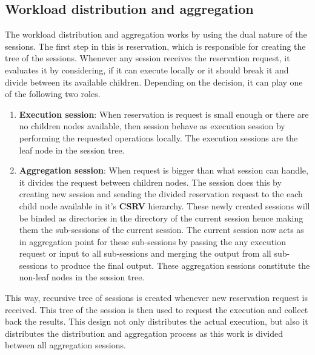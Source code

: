 \subsection{Workload distribution and aggregation}
The workload distribution and aggregation works by using the dual nature of
the sessions.  The first step in this is reservation, which is responsible for
creating the tree of the sessions.  Whenever any session receives the reservation
request, it evaluates it by considering, if it can execute locally or it should
break it and divide between its available children.  Depending on the decision,
it can play one of the following two roles.
\begin{enumerate}
  \item \textbf{Execution session}: When reservation is request is small enough
  or there are no children nodes available, then session behave as execution
  session by performing the requested operations locally.  The execution
  sessions are the leaf node in the session tree.
  
  \item \textbf{Aggregation session}: When request is bigger than what session
  can handle, it divides the request between children nodes.  The session does
  this by creating new session and sending the divided
  reservation request to the each child node available in it's \textbf{CSRV}
  hierarchy.  These newly created sessions will be binded as directories in the
  directory of the current session hence making them the sub-sessions of the
  current session.  The current session now acts as in aggregation point for
  these sub-sessions by passing the any execution request or input to all
  sub-sessions and merging the output from all sub-sessions to produce the final
  output.  These aggregation sessions constitute the non-leaf nodes in the
  session tree.
\end{enumerate}
This way, recursive tree of sessions is created whenever new reservation request
is received.  This tree of the session is then used to request the execution and
collect back the results.  This design not only distributes the actual
execution, but also it distributes the distribution and aggregation process as
this work is divided between all aggregation sessions.

